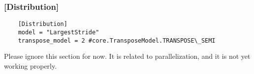 \documentclass[a4paper,12pt]{report}
\begin{document}
\subsubsection*{[Distribution]}
\begin{verbatim}
	[Distribution]
	model = "LargestStride"
	transpose_model = 2 #core.TransposeModel.TRANSPOSE\_SEMI
\end{verbatim}
Please ignore this section for now. It is related to parallelization, and it is not yet working
properly.



\end{document}
